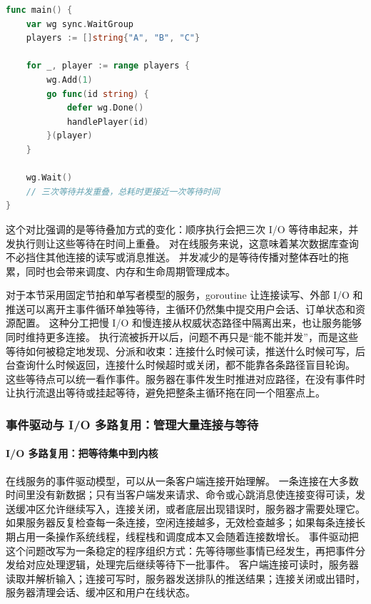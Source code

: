 \begin{tcolorbox}[title=Goroutine 并发读取背包数据：等待相互重叠]
\begin{lstlisting}[style=codeblock, language=go]
func main() {
    var wg sync.WaitGroup
    players := []string{"A", "B", "C"}
    
    for _, player := range players {
        wg.Add(1)
        go func(id string) {
            defer wg.Done()
            handlePlayer(id)
        }(player)
    }
    
    wg.Wait()
    // 三次等待并发重叠，总耗时更接近一次等待时间
}
\end{lstlisting}
\end{tcolorbox}

这个对比强调的是等待叠加方式的变化：顺序执行会把三次 I/O 等待串起来，并发执行则让这些等待在时间上重叠。
对在线服务来说，这意味着某次数据库查询不必挡住其他连接的读写或消息推送。
并发减少的是等待传播对整体吞吐的拖累，同时也会带来调度、内存和生命周期管理成本。

对于本节采用固定节拍和单写者模型的服务，goroutine 让连接读写、外部 I/O 和推送可以离开主事件循环单独等待，主循环仍然集中提交用户会话、订单状态和资源配置。
这种分工把慢 I/O 和慢连接从权威状态路径中隔离出来，也让服务能够同时维持更多连接。
执行流被拆开以后，问题不再只是“能不能并发”，而是这些等待如何被稳定地发现、分派和收束：连接什么时候可读，推送什么时候可写，后台查询什么时候返回，连接什么时候超时或关闭，都不能靠各条路径盲目轮询。
这些等待点可以统一看作事件。服务器在事件发生时推进对应路径，在没有事件时让执行流退出等待或挂起等待，避免把整条主循环拖在同一个阻塞点上。

\subsubsection{事件驱动与 I/O 多路复用：管理大量连接与等待}\label{sec3:channel-select}

\paragraph{I/O 多路复用：把等待集中到内核}

在线服务的事件驱动模型，可以从一条客户端连接开始理解。
一条连接在大多数时间里没有新数据；只有当客户端发来请求、命令或心跳消息使连接变得可读，发送缓冲区允许继续写入，连接关闭，或者底层出现错误时，服务器才需要处理它。
如果服务器反复检查每一条连接，空闲连接越多，无效检查越多；如果每条连接长期占用一条操作系统线程，线程栈和调度成本又会随着连接数增长。
事件驱动把这个问题改写为一条稳定的程序组织方式：先等待哪些事情已经发生，再把事件分发给对应处理逻辑，处理完后继续等待下一批事件。
客户端连接可读时，服务器读取并解析输入；连接可写时，服务器发送排队的推送结果；连接关闭或出错时，服务器清理会话、缓冲区和用户在线状态。

